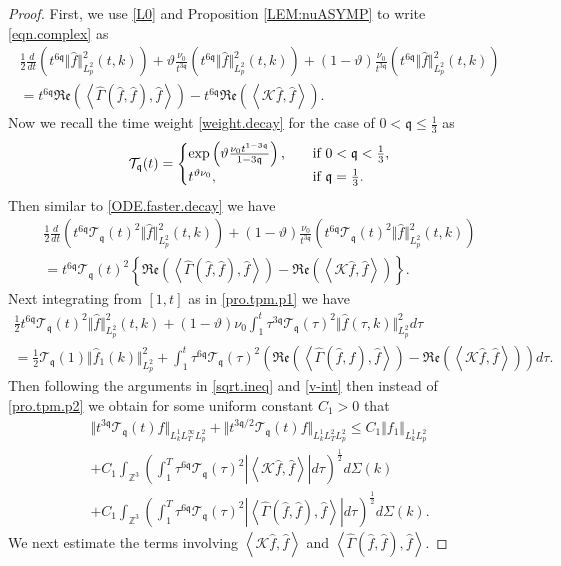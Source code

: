 \documentclass[reqno]{amsart}
\newcommand{\pv}{p}
\def\norm#1{\big\Vert#1\big\Vert}
\newcommand{\irnp}[2]{\left\langle {#1},{#2} \right\rangle}
\newcommand{\qq}{\mathfrak{q}}
\newcommand{\tTq}{t^{3\qq}}
\newcommand{\tQQq}{t^{6\qq}}
\newcommand{\compK}{\mathcal{K}}
\newcommand{\Z}{\mathbb{Z}}
\newcommand{\real}[1]{\mathfrak{Re}\left(#1\right)}
\newcommand{\tc}{\vartheta}
\newcommand{\tw}{\mathcal{T}_{\qq}}
\theoremstyle{definition}
\numberwithin{equation}{section}
\numberwithin{theorem}{section}
\begin{document}
\begin{proof}
 First, we use \eqref{L0} and Proposition \ref{LEM:nuASYMP} to write \eqref{eqn.complex} as
\begin{multline*}
       \frac{1}{2}\frac{d}{dt}  \left( \tQQq
\Vert \hat{f}\Vert_{L^2_{\pv}}^2(t,k)  \right)
+
\tc\frac{\nu_0}{t^{3\qq}}\left( \tQQq
\Vert \hat{f}\Vert_{L^2_{\pv}}^2(t,k)  \right)
+
(1-\tc)\frac{\nu_0}{t^{3\qq}}\left( \tQQq
\Vert \hat{f}\Vert_{L^2_{\pv}}^2(t,k)  \right)
\\
= \tQQq\real{\irnp{\hat{\Gamma}(\hat{f},\hat{f})}{\hat{f}}}
-
\tQQq\real{\irnp{\compK\hat{f}}{\hat{f}}}. 
\end{multline*}
Now we recall the time weight \eqref{weight.decay} for the case of $0 < \qq \leq \frac{1}{3}$ as
\begin{equation}\notag
    \tw(t) =
    \begin{cases}
        \exp\left(\tc\frac{\nu_0 t^{1-3\qq}}{1-3\qq}\right),\quad &\text{if} \,\,0 < \qq<\frac{1}{3},\\
        t^{\tc\nu_0},\qquad &\text{if} \,\,\qq=\frac{1}{3}.
    \end{cases}
\end{equation}
Then similar to \eqref{ODE.faster.decay} we have 
\begin{multline*}
       \frac{1}{2}\frac{d}{dt}  \left( \tQQq \tw(t)^2
\Vert \hat{f}\Vert_{L^2_{\pv}}^2(t,k)  \right)
+
(1-\tc)\frac{\nu_0}{t^{3\qq}}\left( \tQQq \tw(t)^2
\Vert \hat{f}\Vert_{L^2_{\pv}}^2(t,k)  \right)
\\
= \tQQq \tw(t)^2\left\{\real{\irnp{\hat{\Gamma}(\hat{f},\hat{f})}{\hat{f}}}
-
\real{\irnp{\compK\hat{f}}{\hat{f}}} \right\}. 
\end{multline*}
Next integrating from $[1,t]$ as in \eqref{pro.tpm.p1} we have
\begin{multline*}
    \frac{1}{2} \tQQq \tw(t)^2\Vert \hat{f}\Vert_{L^2_{\pv}}^2(t,k)
    +
    (1-\tc)\nu_0\int^t_1 \tau^{3\qq} \tw(\tau)^2
\Vert \hat{f}(\tau,k)\Vert_{L^2_{\pv}}^2  d\tau
\\ 
    =
    \frac{1}{2}\tw(1)\Vert \hat{f}_1(k)\Vert_{L^2_{\pv}}^2
+\int^t_1 \tau^{6\qq}
\tw(\tau)^2\left(\real{\irnp{\hat{\Gamma}(\hat{f},\hat{f})}{\hat{f}}}
-
\real{\irnp{\compK\hat{f}}{\hat{f}}} \right)
d\tau.
\end{multline*}
Then following the arguments in \eqref{sqrt.ineq} and \eqref{v-int} then instead of \eqref{pro.tpm.p2} we obtain for some  uniform constant $C_1>0$ that
\begin{multline*}
        {\Vert{\tTq \tw(t) f}\Vert_{L^1_kL^\infty_TL^2_{\pv}}}
+
{\norm{t^{3\qq/2} \tw(t) f}_{L^1_kL^2_TL^2_{\pv}}}
\leq C_1
\norm{ {f}_1}_{L^1_kL^2_{\pv}}
\\
+ C_1
\int_{\Z^3} 
\left(\int^T_1 \tau^{6\qq} \tw(\tau)^2 \left|\irnp{\compK\hat{f}}{\hat{f}}\right|
d\tau \right)^{\frac12}
d\Sigma(k)
\\
+ C_1
\int_{\Z^3} 
\left(\int^T_1 \tau^{6\qq} \tw(\tau)^2 \left|{\irnp{\hat{\Gamma}(\hat{f},\hat{f})}{\hat{f}}}\right|
d\tau \right)^{\frac12}
d\Sigma(k).
\end{multline*}
We next estimate the terms involving $\irnp{\compK\hat{f}}{\hat{f}}$ and ${\irnp{\hat{\Gamma}(\hat{f},\hat{f})}{\hat{f}}}$.





\end{proof}
\end{document}
